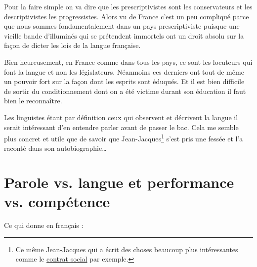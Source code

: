 Pour la faire simple on va dire que les prescriptivistes sont les
conservateurs et les descriptivistes les progressistes. Alors vu de
France c'est un peu compliqué parce que nous sommes fondamentalement
dans un pays prescriptiviste puisque une vieille bande d'illuminés
qui se prétendent immortels ont un droit absolu sur la façon de dicter
les lois de la langue française.

Bien heureusement, en France comme dans tous les pays, ce sont les
locuteurs qui font la langue et non les législateurs. Néanmoins ces
derniers ont tout de même un pouvoir fort sur la façon dont les
esprits sont éduqués. Et il est bien difficile de sortir du
conditionnement dont on a été victime durant son éducation il faut
bien le reconnaître.

Les linguistes étant par définition ceux qui observent et décrivent la
langue il serait intéressant d'en entendre parler avant de passer le
bac. Cela me semble plus concret et utile que de savoir que
Jean-Jacques\footnote{Ce même Jean-Jacques qui a écrit des choses
  beaucoup plus intéressantes comme le \href{https://www.rousseauonline.ch/pdf/rousseauonline-0004.pdf}{contrat social} par exemple.} s'est pris une fessée et l'a raconté dans son autobiographie\dots{}

\newpage
\section{Parole vs. langue et performance vs. compétence}

\begin{center}
\begin{mdframed}[style=citestyle, frametitle={Extrait du livre \bs}]
\end{mdframed}  
\end{center}


Ce qui donne en français :

\begin{center}
\begin{mdframed}[style=tradstyle, frametitle={\exFR{Traduction} d'un extrait du livre \bs}]
\end{mdframed}  
\end{center}


